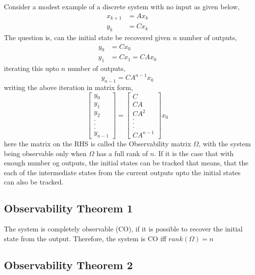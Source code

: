 Consider a modest example of a discrete system with no input as given below, 
\begin{align}
x_{k+1} &= A x_{k} \\
y_{k} &= C x_{k}
\end{align} 
The question is, can the initial state be recovered given $n$ number of outputs, 
\begin{align}
y_{0} &= C x_{0} \\
y_{1} &= C x_{1} = C A x_{0}
\end{align}
iterating this upto $n$ number of outputs, $$y_{n-1} = C A^{n-1} x_{0}$$ writing the above
iteration in matrix form,
\begin{equation}
	\begin{bmatrix}y_{0} \\y_{1} \\ y_{2} \\ . \\ . \\. \\ y_{n-1}
	\end{bmatrix} = \begin{bmatrix}C \\ CA \\ CA^{2} \\ . \\ . \\. \\ C A^{n-1} \end{bmatrix} x_{0}
\end{equation}
here the matrix on the RHS is called the Observability matrix $\Omega$, with the system being observable only when $\Omega$ has a full rank of $n$. If it is the case that with enough number og outputs, the initial states can be tracked that means, that the each of the intermediate states from the current outputs upto the initial states can also be tracked.

\subsection{Observability Theorem 1}

The system is completely observable (CO), if it is possible to recover
the initial state from the output. Therefore, the system is CO iff
$rank(\Omega) = n $

\subsection{Observability Theorem 2}

